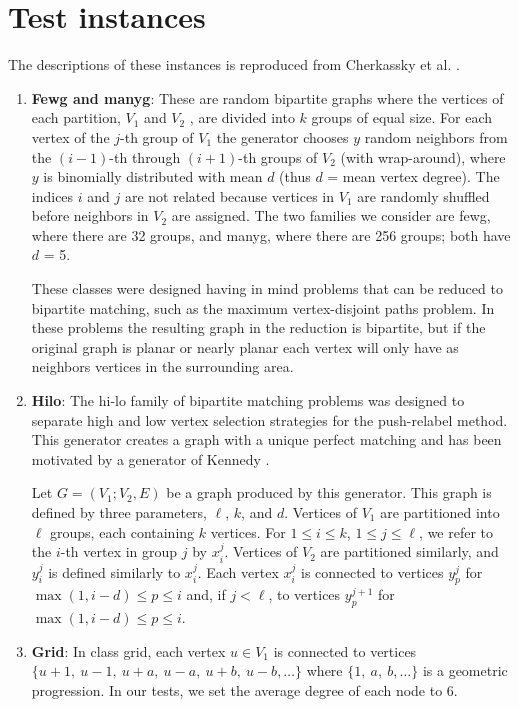 \documentclass{article}
\begin{document}
\section{Test instances}
\label{sec:instances}


The descriptions of these instances is reproduced from Cherkassky et al. \cite{CheGMSS98}.

\begin{enumerate}
\item {\bf Fewg and manyg}: These are random bipartite graphs where the vertices of each partition, $V_1$ and $V_2$ , are divided into $k$ groups of equal size. For each vertex of the $j$-th group of $V_1$ the generator chooses $y$ random neighbors from the $(i-1)$-th through $(i+1)$-th groups of $V_2$ (with wrap-around), where $y$ is binomially distributed with mean $d$ (thus $d$ = mean vertex degree). The indices $i$ and $j$ are not related because vertices in $V_1$ are randomly shuffled before neighbors in $V_2$ are assigned. The two families we consider are {\sf fewg}, where there are 32 groups, and {\sf manyg}, where there are 256 groups; both have $d$ = 5.

These classes were designed having in mind problems that can be reduced to bipartite matching, such as the maximum vertex-disjoint paths problem. In these problems the resulting graph in the reduction is bipartite, but if the original graph is planar or nearly planar each vertex will only have as neighbors vertices in the surrounding area.

\item {\bf Hilo}: The {\sf hi-lo} family of bipartite matching problems was designed to separate high and low vertex selection strategies for the push-relabel method. This generator creates a graph with a unique perfect matching and has been motivated by a generator of Kennedy \cite{Ken95}.

Let $G = (V_1;V_2, E)$ be a graph produced by this generator. This graph is defined by three parameters, $\ell$, $k$, and $d$. Vertices of $V_1$ are partitioned into $\ell$ groups, each containing $k$ vertices. For $1 \leq i \leq k$, $1 \leq j \leq \ell$, we refer to the $i$-th vertex in group $j$ by $x^j_i$. Vertices of $V_2$ are partitioned similarly, and $y^j_i$ is defined similarly to $x^j_i$. Each vertex $x^j_i$ is connected to vertices $y^j_p$ for $\max(1, i-d) \leq p \leq i$ and, if $j < \ell$, to vertices $y^{j+1}_p$ for $\max(1, i-d) \leq p \leq i$.

\item {\bf Grid}: In class {\sf grid}, each vertex $u \in V_1$ is connected to vertices $\{u+1,\ u-1,\ u+a,\ u-a,\ u+b,\ u-b, \ldots\}$ where $\{1,\ a,\ b, \ldots\}$ is a geometric progression. In our tests, we set the average degree of each node to 6.


\end{enumerate}
\end{document}
